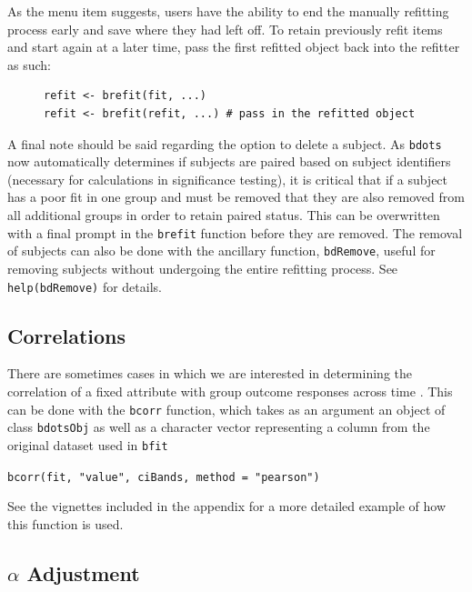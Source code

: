 \documentclass{article}
\newcommand{\xt}{\texttt}%
\begin{document}
As the menu item suggests, users have the ability to end the manually refitting process early and save where they had left off. To retain previously refit items and start again at a later time, pass the first refitted object back into the refitter as such:

\begin{singlespace}
\begin{figure}[H]
\centering
\begin{BVerbatim}
refit <- brefit(fit, ...)
refit <- brefit(refit, ...) # pass in the refitted object
\end{BVerbatim}
\end{figure}
\end{singlespace}



A final note should be said regarding the option to delete a subject. As \xt{bdots} now automatically determines if subjects are paired based on subject identifiers (necessary for  calculations in significance testing), it is critical that if a subject has a poor fit in one group and must be removed that they are also removed from all additional groups in order to retain paired status. This can be overwritten with a final prompt in the \xt{brefit} function before they are removed. The removal of subjects can also be done with the ancillary function, \xt{bdRemove}, useful for removing subjects without undergoing the entire refitting process. See \xt{help(bdRemove)} for details.


\subsection{Correlations}

There are sometimes cases in which we are interested in determining the correlation of a fixed attribute with group outcome responses across time . This can be done with the \xt{bcorr} function, which takes as an argument an object of class \xt{bdotsObj} as well as a character vector representing a column from the original dataset used in \xt{bfit}

\begin{center}
\xt{bcorr(fit, "value", ciBands, method = "pearson")} 
\end{center}

See the vignettes included in the appendix for a more detailed example of how this function is used.

\subsection{$\alpha$ Adjustment}
\end{document}
